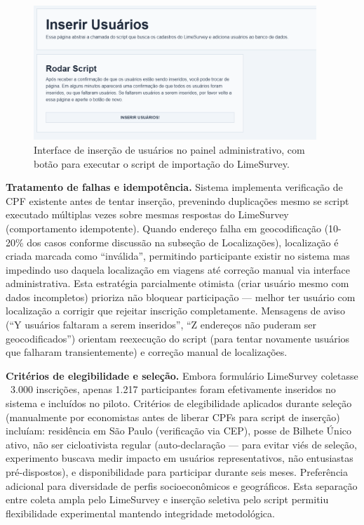 \begin{figure}[H]
  \centering
  \includegraphics[width=0.95\textwidth]{figuras/inserir_usuarios.PNG}
  \caption{Interface de inserção de usuários no painel administrativo, com botão para executar o script de importação do LimeSurvey.}
  \label{fig:insercao_usuarios}
\end{figure}

\textbf{Tratamento de falhas e idempotência.} Sistema implementa verificação de CPF existente antes de tentar inserção, prevenindo duplicações mesmo se script executado múltiplas vezes sobre mesmas respostas do LimeSurvey (comportamento idempotente). Quando endereço falha em geocodificação (10-20\% dos casos conforme discussão na subseção de Localizações), localização é criada marcada como ``inválida'', permitindo participante existir no sistema mas impedindo uso daquela localização em viagens até correção manual via interface administrativa. Esta estratégia parcialmente otimista (criar usuário mesmo com dados incompletos) prioriza não bloquear participação --- melhor ter usuário com localização a corrigir que rejeitar inscrição completamente. Mensagens de aviso (``Y usuários faltaram a serem inseridos'', ``Z endereços não puderam ser geocodificados'') orientam reexecução do script (para tentar novamente usuários que falharam transientemente) e correção manual de localizações.

\textbf{Critérios de elegibilidade e seleção.} Embora formulário LimeSurvey coletasse ~3.000 inscrições, apenas 1.217 participantes foram efetivamente inseridos no sistema e incluídos no piloto. Critérios de elegibilidade aplicados durante seleção (manualmente por economistas antes de liberar CPFs para script de inserção) incluíam: residência em São Paulo (verificação via CEP), posse de Bilhete Único ativo, não ser cicloativista regular (auto-declaração --- para evitar viés de seleção, experimento buscava medir impacto em usuários representativos, não entusiastas pré-dispostos), e disponibilidade para participar durante seis meses. Preferência adicional para diversidade de perfis socioeconômicos e geográficos. Esta separação entre coleta ampla pelo LimeSurvey e inserção seletiva pelo script permitiu flexibilidade experimental mantendo integridade metodológica.

